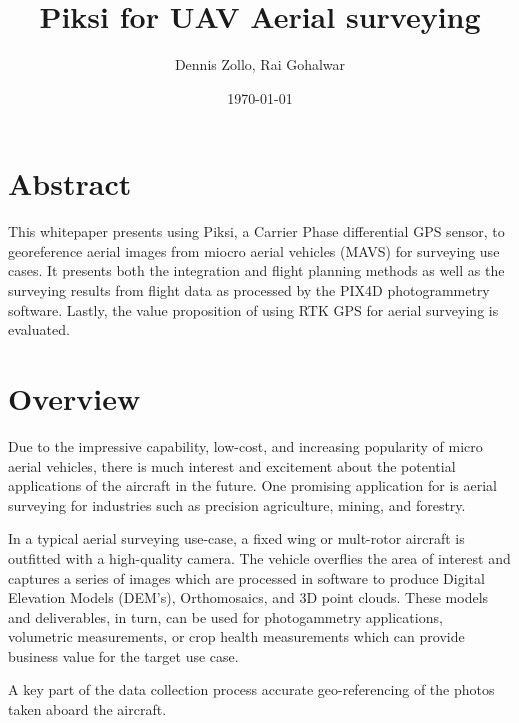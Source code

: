 \documentclass{article}
\title{Piksi for UAV Aerial surveying}
\author{Dennis Zollo, Rai Gohalwar}
\date{\today}
\begin{document}
\maketitle

\thispagestyle{firstpage}

\section{Abstract}
\label{sec:abstract}
This whitepaper presents using Piksi, a Carrier Phase differential GPS sensor, to georeference aerial images from miocro aerial vehicles (MAVS) for surveying use cases.
It presents both the integration and flight planning methods as well as the surveying  results from flight data as processed by the PIX4D photogrammetry software.
Lastly, the value proposition of using RTK GPS for aerial surveying is evaluated.
\tableofcontents
\newpage
\section{Overview}
\label{sec:Overview}
Due to the impressive capability, low-cost, and increasing popularity of micro aerial vehicles, there is much interest and excitement about the potential applications of the aircraft in the future. One promising application for is aerial surveying for industries such as precision agriculture, mining, and forestry.

In a typical aerial surveying use-case, a fixed wing or mult-rotor aircraft is outfitted with a high-quality camera.  The vehicle overflies the area of interest and captures a series of images which are processed in software to produce Digital Elevation Models (DEM's), Orthomosaics, and 3D point clouds.  These models and deliverables, in turn, can be used for photogammetry applications, volumetric measurements, or crop health measurements which can provide business value for the target use case.

A key part of the data collection process accurate geo-referencing of the photos taken aboard the aircraft.
\end{document}
